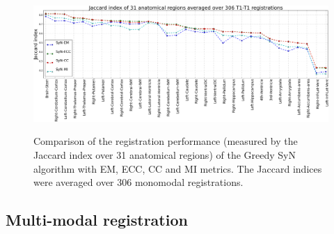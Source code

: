 \begin{figure}[t!]
\centering
\includegraphics[width=1.0\linewidth]{./images/mono_lines_seg.png}\\
\caption{{\small Comparison of the registration performance (measured by the Jaccard index over 31 anatomical regions) of the Greedy SyN algorithm with EM, ECC, CC and MI metrics. The Jaccard indices were averaged over 306 monomodal registrations.}}
\label{fig:mono_graph_seg}\figcloser
\end{figure}

\subsection{Multi-modal registration}\label{sec:multimodal_results}

